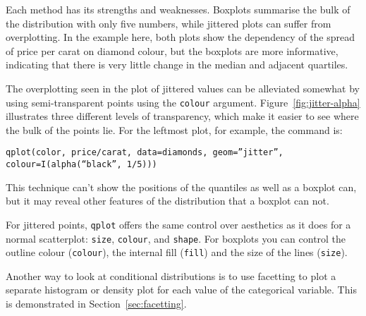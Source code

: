 Each method has its strengths and weaknesses.  Boxplots summarise the bulk of the distribution with only five numbers, while jittered plots can suffer from overplotting.  In the example here, both plots show the dependency of the spread of price per carat on diamond colour, but the boxplots are more informative, indicating that there is very little change in the median and adjacent quartiles.

The overplotting seen in the plot of jittered values can be alleviated somewhat by using semi-transparent points using the {\tt colour} argument. Figure~\ref{fig:jitter-alpha} illustrates three different levels of transparency, which make it easier to see where the bulk of the points lie.  For the leftmost plot, for example, the command is:

{\tt qplot(color, price/carat, data=diamonds, geom=''jitter'', colour=I(alpha(``black'', 1/5)))}


 This technique can't show the positions of the quantiles as well as a boxplot can, but it may reveal other features of the distribution that a boxplot can not.

% 


% 
For jittered points, {\tt qplot} offers the same control over aesthetics as it does for  a normal scatterplot: {\tt size}, {\tt colour}, and {\tt shape}.  For boxplots you can control the outline colour ({\tt colour}), the internal fill ({\tt fill}) and the size of the lines ({\tt size}).

Another way to look at conditional distributions is to use facetting to plot a separate histogram or density plot for each value of the categorical variable.  This is demonstrated in Section~\ref{sec:facetting}.

